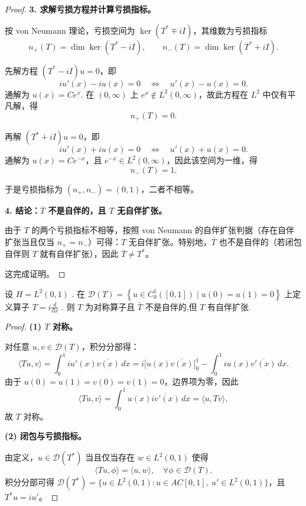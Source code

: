 \documentclass[lang=cn,newtx,10pt,scheme=chinese,thmcnt=chapter]{elegantbook}
\newcommand{\dif}{\mathrm{d}}
\begin{document}
\begin{problemset}
\begin{proof}
\medskip

\textbf{3. 求解亏损方程并计算亏损指标。}

按 von Neumann 理论，亏损空间为 $\ker(T^*\mp iI)$，其维数为亏损指标
\[
n_+(T)=\dim\ker(T^*-iI),\qquad n_-(T)=\dim\ker(T^*+iI).
\]

先解方程 $(T^*-iI)u=0$，即
\[
i u'(x) - i u(x)=0 \quad\Longleftrightarrow\quad u'(x)-u(x)=0.
\]
通解为 $u(x)=C e^{x}$. 在 $(0,\infty)$ 上 $e^{x}\not\in L^2(0,\infty)$，故此方程在 $L^2$ 中仅有平凡解，得
\[
n_+(T)=0.
\]

再解 $(T^*+iI)u=0$，即
\[
i u'(x) + i u(x)=0 \quad\Longleftrightarrow\quad u'(x)+u(x)=0.
\]
通解为 $u(x)=C e^{-x}$，且 $e^{-x}\in L^2(0,\infty)$，因此该空间为一维，得
\[
n_-(T)=1.
\]

于是亏损指标为 $(n_+,n_-)=(0,1)$，二者不相等。

\medskip

\textbf{4. 结论：$\overline T$ 不是自伴的，且 $T$ 无自伴扩张。}

由于 $T$ 的两个亏损指标不相等，按照 von Neumann 的自伴扩张判据（存在自伴扩张当且仅当 $n_+=n_-$）可得：$T$ 无自伴扩张。特别地，$\overline T$ 也不是自伴的（若闭包自伴则 $T$ 就有自伴扩张），因此 $\overline T\neq T^*$。

这完成证明。
\end{proof}
\item 设 \(H = {L}^{2}\left( {0,1}\right)\) . 在 \(\mathcal{D}(T)  = \left\{  {u \in  {C}_{0}^{1}\left( \left\lbrack  {0,1}\right\rbrack  \right)  \mid  u\left( 0\right)  = u\left( 1\right)  = 0}\right\}\) 上定义算子 \(T = i\frac{d}{\dif x}\) . 则 \(T\) 为对称算子且 \(\bar{T}\) 不是自伴的,但 \(T\) 有自伴扩张.

\begin{proof}
\textbf{(1) $T$ 对称。} 

对任意 $u,v\in \mathcal D(T)$，积分分部得：
\[
\langle Tu, v \rangle = \int_0^1 i u'(x) \overline{v(x)} \, dx
= i \big[ u(x)\overline{v(x)} \big]_0^1 - \int_0^1 i u(x) \overline{v'(x)} \, dx.
\]
由于 $u(0)=u(1)=v(0)=v(1)=0$，边界项为零，因此
\[
\langle Tu, v \rangle = \int_0^1 u(x) \overline{i v'(x)} \, dx = \langle u, Tv \rangle,
\]
故 $T$ 对称。

\textbf{(2) 闭包与亏损指标。}

由定义，$u \in \mathcal D(T^*)$ 当且仅当存在 $w\in L^2(0,1)$ 使得
\[
\langle Tu, \phi \rangle = \langle u, w \rangle, \quad \forall \phi \in \mathcal D(T).
\]
积分分部可得 $\mathcal D(T^*) = \{ u \in L^2(0,1) : u \in AC[0,1],\ u' \in L^2(0,1) \}$，且 $T^* u = i u'$。


\end{proof}
\end{problemset}
\end{document}
